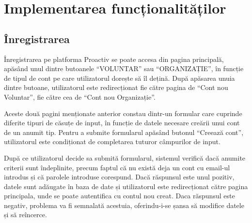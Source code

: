 \documentclass[12pt,a4paper]{report}
\begin{document}
\chapter{Implementarea funcționalităților}
\section{Înregistrarea}
\par
Înregistrarea pe platforma Proactiv se poate accesa din pagina principală, apăsând unul dintre butoanele  “VOLUNTAR” sau  “ORGANIZAȚIE”, în funcție de tipul de cont pe care utilizatorul dorește să îl dețină. După apăsarea unuia dintre butoane, utilizatorul este redirecționat fie către pagina de  “Cont nou Voluntar”, fie către cea de  “Cont nou Organizație”.
\\
\par
Aceste două pagini menționate anterior constau dintr-un formular care cuprinde diferite tipuri de căsuțe de input, în funcție de datele necesare creării unui cont de un anumit tip. Pentru a submite formularul apăsând butonul  “Creează cont”, utilizatorul este condiționat de completarea tuturor câmpurilor de input. 
\\
\par
După ce utilizatorul decide sa submită formularul, sistemul verifică dacă anumite criterii sunt îndeplinite, precum faptul că nu există deja un cont cu email-ul introdus și că parolele introduse corespund. Dacă răspunsul este unul pozitiv, datele sunt adăugate în baza de date și utilizatorul este redirecționat către pagina principala, unde se poate autentifica cu contul nou creat. Daca răspunsul este negativ, problema va fi semnalată acestuia, oferindu-i-se șansa să modifice datele și să reîncerce.
\\
\lstset{showstringspaces=false}
\end{document}
